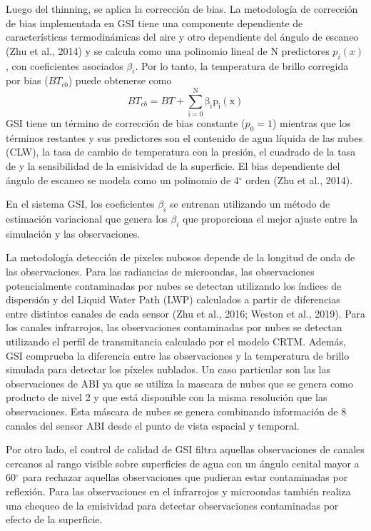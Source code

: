 \documentclass[12pt,oneside]{reedthesis}
\begin{document}
Luego del thinning, se aplica la corrección de bias. La metodología de corrección de bias implementada en GSI tiene una componente dependiente de características termodinámicas del aire y otro dependiente del ángulo de escaneo (Zhu et al., 2014) y se calcula como una polinomio lineal de N predictores \(p_i(x)\), con coeficientes asociados \(\beta_i\). Por lo tanto, la temperatura de brillo corregida por bias (\(BT_{cb}\)) puede obtenerse como
\begin{equation}
\mathrm{\mathit{BT_{cb}} =\mathit{ BT} + \sum_{i = 0}^{N} \beta_i p_i (x)}
\label{eq:eq12}
\end{equation}
GSI tiene un término de corrección de bias constante (\(p_0 = 1\)) mientras que los términos restantes y sus predictores son el contenido de agua líquida de las nubes (CLW), la tasa de cambio de temperatura con la presión, el cuadrado de la tasa de y la sensibilidad de la emisividad de la superficie. El bias dependiente del ángulo de escaneo se modela como un polinomio de 4\(^\circ\) orden (Zhu et al., 2014).

En el sistema GSI, los coeficientes \(\beta_i\) se entrenan utilizando un método de estimación variacional que genera los \(\beta_i\) que proporciona el mejor ajuste entre la simulación y las observaciones.

La metodología detección de pixeles nubosos depende de la longitud de onda de las observaciones. Para las radiancias de microondas, las observaciones potencialmente contaminadas por nubes se detectan utilizando los índices de dispersión y del Liquid Water Path (LWP) calculados a partir de diferencias entre distintos canales de cada sensor (Zhu et al., 2016; Weston et al., 2019). Para los canales infrarrojos, las observaciones contaminadas por nubes se detectan utilizando el perfil de transmitancia calculado por el modelo CRTM. Además, GSI comprueba la diferencia entre las observaciones y la temperatura de brillo simulada para detectar los píxeles nublados. Un caso particular son las las observaciones de ABI ya que se utiliza la mascara de nubes que se genera como producto de nivel 2 y que está disponible con la misma resolución que las observaciones. Esta máscara de nubes se genera combinando información de 8 canales del sensor ABI desde el punto de vista espacial y temporal.

Por otro lado, el control de calidad de GSI filtra aquellas observaciones de canales cercanos al rango visible sobre superficies de agua con un ángulo cenital mayor a 60\(^{\circ}\) para rechazar aquellas observaciones que pudieran estar contaminadas por reflexión. Para las observaciones en el infrarrojos y microondas también realiza una chequeo de la emisividad para detectar observaciones contaminadas por efecto de la superficie.
\end{document}
